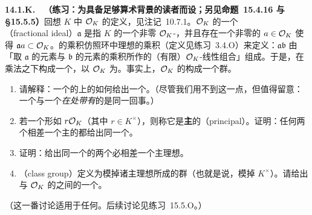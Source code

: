 \textbf{14.1.K.}\ \hard\ \textbf{（练习：为具备足够算术背景的读者而设；另见命题~15.4.16 与 \S15.5.5）}\quad 回想\trNumberField{} $K$ 中\trRingOfIntegers{} $\mathcal{O}_K$ 的定义，见注记~10.7.1。$\mathcal{O}_K$ 的一个\textbf{\trFractionalIdeal}（fractional ideal）$\mathfrak{a}$ 是指 $K$ 的一个非零 $\mathcal{O}_K$-\trSubmodule，并且存在一个非零的 $a\in\mathcal{O}_K$ 使得 $\mathfrak{a}a\subset\mathcal{O}_K$。\trFractionalIdeal{}的乘积仿照环中理想的乘积（定义见\mbox{练习~3.4.O}）来定义：$\mathfrak{a}\mathfrak{b}$ 由「取 $\mathfrak{a}$ 的元素与 $\mathfrak{b}$ 的元素的乘积所作的（有限）$\mathcal{O}_K$-线性组合」组成。于是，\trFractionalIdeal{}在乘法之下构成一个\trAbelianSemigroup，以 $\mathcal{O}_K$ 为\trUnit。事实上，$\mathcal{O}_K$ 的\trFractionalIdeal{}构成一个群。
\begin{enumerate}[label=(\alph*)]
\item 请解释：一个\trNumberField{}的\trRingOfIntegers{}上的\trFractionalIdeal{}如何给出一个\trInvertibleSheaf。（尽管我们用不到这一点，但值得留意：一个\trFractionalIdeal{}与一个\emph{在\trGenericPoint{}处带有\trTrivialization}的\trInvertibleSheaf{}是同一回事。）
\item 若一个\trFractionalIdeal{}形如 $r\mathcal{O}_K$（其中 $r\in K^{\times}$），则称它是\textbf{主}的（principal）。证明：任何两个相差一个主\trFractionalIdeal{}的\trFractionalIdeal{}都给出同一个\trInvertibleSheaf。
\item 证明：给出同一个\trInvertibleSheaf{}的两个\trFractionalIdeal{}必相差一个主理想。
\item \textbf{\trClassGroup}（class group）定义为\trFractionalIdeal{}模掉诸主理想所成的群（也就是说，模掉 $K^{\times}$）。请给出\trClassGroup{}与 $\mathcal{O}_K$ 的\trPicardGroup{}之间的一个\trIsomorphism。
\end{enumerate}
（这一番讨论适用于任何\trDedekindDomain。后续讨论见\mbox{练习~15.5.O}。）

